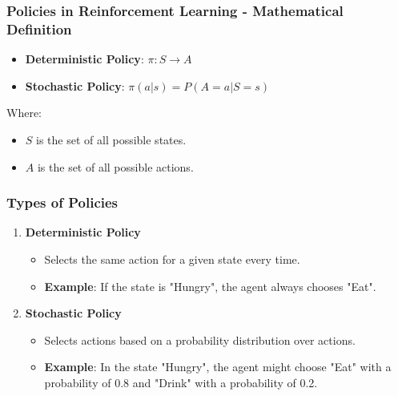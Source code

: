 \documentclass[aspectratio=169]{beamer}
\begin{document}
\begin{frame}[fragile]
    \frametitle{Policies in Reinforcement Learning - Mathematical Definition}
    \begin{itemize}
        \item \textbf{Deterministic Policy}: \( \pi: S \rightarrow A \)
        \item \textbf{Stochastic Policy}: \( \pi(a|s) = P(A = a | S = s) \)
    \end{itemize}
    Where:
    \begin{itemize}
        \item \( S \) is the set of all possible states.
        \item \( A \) is the set of all possible actions.
    \end{itemize}
\end{frame}

\begin{frame}[fragile]
    \frametitle{Types of Policies}
    \begin{enumerate}
        \item \textbf{Deterministic Policy}
            \begin{itemize}
                \item Selects the same action for a given state every time.
                \item \textbf{Example}: If the state is "Hungry", the agent always chooses "Eat".
            \end{itemize}
        \item \textbf{Stochastic Policy}
            \begin{itemize}
                \item Selects actions based on a probability distribution over actions.
                \item \textbf{Example}: In the state "Hungry", the agent might choose "Eat" with a probability of 0.8 and "Drink" with a probability of 0.2.
            \end{itemize}
    \end{enumerate}
\end{frame}
\end{document}
